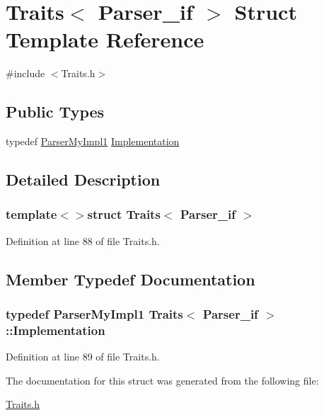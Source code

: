 \hypertarget{struct_traits_3_01_parser__if_01_4}{\section{Traits$<$ Parser\-\_\-if $>$ Struct Template Reference}
\label{struct_traits_3_01_parser__if_01_4}
}


{\ttfamily \#include $<$Traits.\-h$>$}

\subsection*{Public Types}
\begin{DoxyCompactItemize}
\item 
typedef \hyperlink{class_parser_my_impl1}{Parser\-My\-Impl1} \hyperlink{struct_traits_3_01_parser__if_01_4_ad255fa4d0635c0fd54986d3c2e8f53da}{Implementation}
\end{DoxyCompactItemize}


\subsection{Detailed Description}
\subsubsection*{template$<$$>$struct Traits$<$ Parser\-\_\-if $>$}



Definition at line 88 of file Traits.\-h.



\subsection{Member Typedef Documentation}
\hypertarget{struct_traits_3_01_parser__if_01_4_ad255fa4d0635c0fd54986d3c2e8f53da}{
\subsubsection[{Implementation}]{\setlength{\rightskip}{0pt plus 5cm}typedef {\bf Parser\-My\-Impl1} {\bf Traits}$<$ {\bf Parser\-\_\-if} $>$\-::{\bf Implementation}}}\label{struct_traits_3_01_parser__if_01_4_ad255fa4d0635c0fd54986d3c2e8f53da}


Definition at line 89 of file Traits.\-h.



The documentation for this struct was generated from the following file\-:\begin{DoxyCompactItemize}
\item 
\hyperlink{_traits_8h}{Traits.\-h}\end{DoxyCompactItemize}
